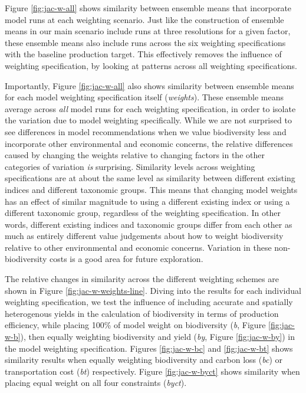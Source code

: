 \documentclass[
]{article}
\begin{document}
Figure \ref{fig:jac-w-all} shows similarity between ensemble means that incorporate model runs at each weighting scenario. Just like the construction of ensemble means in our main scenario include runs at three resolutions for a given factor, these ensemble means also include runs across the six weighting specifications with the baseline production target. This effectively removes the influence of weighting specification, by looking at patterns across all weighting specifications.

Importantly, Figure \ref{fig:jac-w-all} also shows similarity between ensemble means for each model weighting specification itself (\emph{weights}). These ensemble means average across \emph{all} model runs for each weighting specification, in order to isolate the variation due to model weighting specifically. While we are not surprised to see differences in model recommendations when we value biodiversity less and incorporate other environmental and economic concerns, the relative differences caused by changing the weights relative to changing factors in the other categories of variation \emph{is} surprising. Similarity levels across weighting specifications are at about the same level as similarity between different existing indices and different taxonomic groups. This means that changing model weights has an effect of similar magnitude to using a different existing index or using a different taxonomic group, regardless of the weighting specification. In other words, different existing indices and taxonomic groups differ from each other as much as entirely different value judgements about how to weight biodiversity relative to other environmental and economic concerns. Variation in these non-biodiversity costs is a good area for future exploration.

The relative changes in similarity across the different weighting schemes are shown in Figure \ref{fig:jac-w-weights-line}. Diving into the results for each individual weighting specification, we test the influence of including accurate and spatially heterogenous yields in the calculation of biodiversity in terms of production efficiency, while placing 100\% of model weight on biodiversity (\emph{b}, Figure \ref{fig:jac-w-b}), then equally weighting biodiversity and yield (\emph{by}, Figure \ref{fig:jac-w-by}) in the model weighting specification. Figures \ref{fig:jac-w-bc} and \ref{fig:jac-w-bt} shows similarity results when equally weighting biodiversity and carbon loss (\emph{bc}) or transportation cost (\emph{bt}) respectively. Figure \ref{fig:jac-w-byct} shows similarity when placing equal weight on all four constraints (\emph{byct}).
\end{document}
